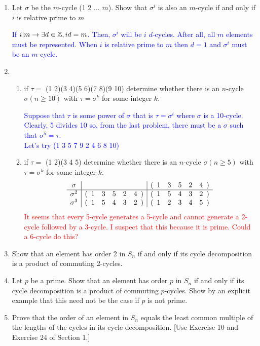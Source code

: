 \documentclass[10pt,a4paper]{report}
\newcommand{\RED}[1]{\textcolor{red}{#1}}
\newcommand{\BLUE}[1]{\textcolor{blue}{#1}}
\begin{document}
\begin{enumerate}
\item Let $\sigma$ be the $m$-cycle (1 2 $\dots$ $m$).  Show that $\sigma^i$ is also an $m$-cycle if and only if $i$ is relative prime to $m$

\BLUE{If $i|m \to \exists d \in \mathbb{Z}, id=m$.  Then, $\sigma^i$ will be $i$ $d$-cycles.  After all, all $m$ elements must be represented.  When $i$ is relative prime to $m$ then $d=1$ and $\sigma^i$ must be an $m$-cycle.
}

\item \begin{enumerate}
	\item if $\tau=$ (1 2)(3 4)(5 6)(7 8)(9 10) determine whether there is an $n$-cycle $\sigma (n\ge 10)$ with $\tau=\sigma^k$ for some integer $k$.
	
	\BLUE{Suppose that $\tau$ is some power of $\sigma$ that is $\tau = \sigma^i$ where $\sigma$ is a 10-cycle.  Clearly, 5 divides 10 so, from the last problem, there must be a $\sigma$ such that $\sigma^5= \tau$.\\
	Let's try (1 3 5 7 9 2 4 6 8 10)
	}
	
	\item if $\tau =$  (1 2)(3 4 5) determine whether there is an $n$-cycle $\sigma (n \ge 5)$ with $\tau=\sigma^k$ for some integer $k$.
	\RED{
	\begin{align*}
		\begin{array}{c|c|c}
			\sigma&	& (\begin{array}{cccccccccc} 1&3&5&2&4 \end{array}) \\
			\hline
			\sigma^2&(\begin{array}{cccccccccc} 1&3&5&2&4 \end{array}) & (\begin{array}{cccccccccc} 1&5&4&3&2 \end{array}) \\
			\sigma^3&(\begin{array}{cccccccccc} 1&5&4&3&2 \end{array}) & (\begin{array}{cccccccccc} 1&2&3&4&5 \end{array})
		\end{array}
	\end{align*}It seems that every 5-cycle generates a 5-cycle and cannot generate a 2-cycle followed by a 3-cycle.  I suspect that this because it is prime.  Could a 6-cycle do this?
	}
\end{enumerate}

\item Show that an element has order 2 in $S_n$ if and only if its cycle decomposition is a product of commuting 2-cycles.

\item Let $p$ be a prime.  Show that an element has order $p$ in $S_n$ if and only if its cycle decomposition is a product of commuting $p$-cycles.  Show by an explicit example that this need not be the case if $p$ is not prime.

\item Prove that the order of an element in $S_n$ equals the least common multiple of the lengths of the cycles in its cycle decomposition. [Use Exercise 10 and Exercise 24 of Section 1.]


\end{enumerate}
\end{document}
